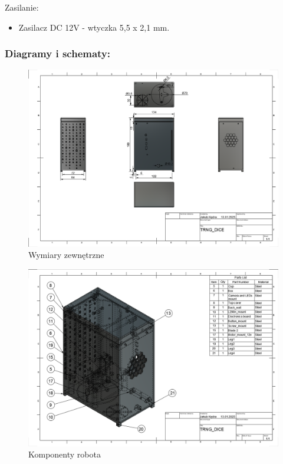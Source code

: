 Zasilanie:
\begin{itemize}
    \item Zasilacz DC 12V - wtyczka 5,5 x 2,1 mm.
\end{itemize}


\subsubsection{Diagramy i schematy:}

\begin{figure}[H]
    \centering
    \includegraphics[width=0.95\linewidth]{chapters/03-praca-wlasna/figures/wymiary.png}
    \caption{\label{fig:wymiary}Wymiary zewnętrzne}
\end{figure}

\begin{figure}[H]
    \centering
    \includegraphics[width=0.95\linewidth]{chapters/03-praca-wlasna/figures/komponenty.png}
    \caption{\label{fig:komponenty}Komponenty robota}
\end{figure}

